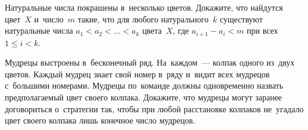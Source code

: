 \begin{problems}



\item
Натуральные числа покрашены в~несколько цветов.
Докажите, что найдутся цвет~$X$ и~число~$m$ такие, что для любого
натурального~$k$ существуют натуральные числа $a_{1} < a_{2} < \ldots < a_{k}$
цвета~$X$, где $a_{i+1} - a_{i} < m$ при всех $1 \leq i < k$.

\item
Мудрецы выстроены в~бесконечный ряд.
На~каждом~--- колпак одного из~двух цветов.
Каждый мудрец знает свой номер в~ряду и~видит всех мудрецов с~большими
номерами.
Мудрецы по~команде должны одновременно назвать предполагаемый цвет своего
колпака.
Докажите, что мудрецы могут заранее договориться о~стратегии так, чтобы при
любой расстановке колпаков не~угадало цвет своего колпака лишь конечное число
мудрецов.

\end{problems}
